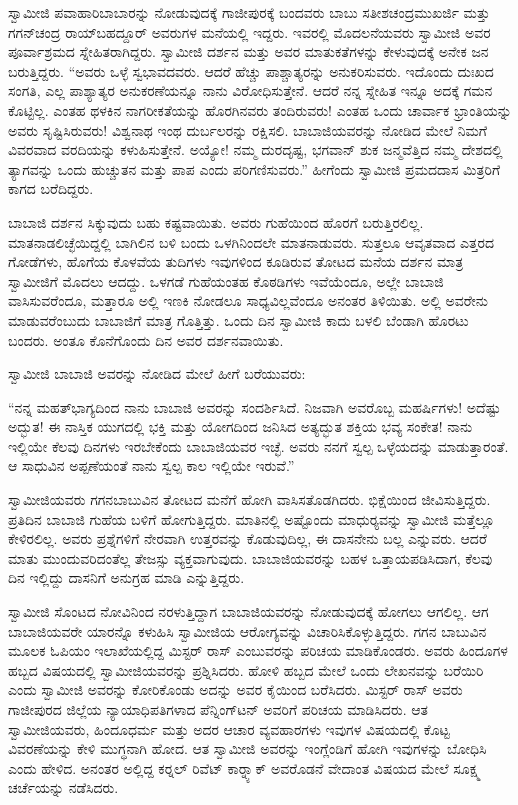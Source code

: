  ಸ್ವಾಮೀಜಿ ಪವಾಹಾರಿಬಾಬಾರನ್ನು ನೋಡುವುದಕ್ಕೆ ಗಾಜೀಪುರಕ್ಕೆ ಬಂದವರು ಬಾಬು ಸತೀಶಚಂದ್ರಮುಖರ್ಜಿ ಮತ್ತು ಗಗನ್‍ಚಂದ್ರ ರಾಯ್‍ಬಹದ್ದೂರ್ ಅವರುಗಳ ಮನೆಯಲ್ಲಿ ಇದ್ದರು. ಇವರಲ್ಲಿ ಮೊದಲನೆಯವರು ಸ್ವಾಮೀಜಿ ಅವರ ಪೂರ್ವಾಶ್ರಮದ ಸ್ನೇಹಿತರಾಗಿದ್ದರು. ಸ್ವಾಮೀಜಿ ದರ್ಶನ ಮತ್ತು ಅವರ ಮಾತುಕತೆಗಳನ್ನು ಕೇಳುವುದಕ್ಕೆ ಅನೇಕ ಜನ ಬರುತ್ತಿದ್ದರು. “ಅವರು ಒಳ್ಳೆ ಸ್ವಭಾವದವರು. ಆದರೆ ಹೆಚ್ಚು ಪಾಶ್ಚಾತ್ಯರನ್ನು ಅನುಕರಿಸುವರು. ಇದೊಂದು ದುಃಖದ ಸಂಗತಿ, ಎಲ್ಲ ಪಾಶ್ಯಾತ್ಯರ ಅನುಕರಣೆಯನ್ನೂ ನಾನು ವಿರೋಧಿಸುತ್ತೇನೆ. ಆದರೆ ನನ್ನ ಸ್ನೇಹಿತ ಇನ್ನೂ ಅದಕ್ಕೆ ಗಮನ ಕೊಟ್ಟಿಲ್ಲ. ಎಂತಹ ಥಳಕಿನ ನಾಗರೀಕತೆಯನ್ನು ಹೊರಗಿನವರು ತಂದಿರುವರು! ಎಂತಹ ಒಂದು ಚಾರ್ವಾಕ ಭ್ರಾಂತಿಯನ್ನು ಅವರು ಸೃಷ್ಟಿಸಿರುವರು! ವಿಶ್ವನಾಥ ಇಂಥ ದುರ್ಬಲರನ್ನು ರಕ್ಷಿಸಲಿ. ಬಾಬಾಜಿಯವರನ್ನು ನೋಡಿದ ಮೇಲೆ ನಿಮಗೆ ವಿವರವಾದ ವರದಿಯನ್ನು ಕಳುಹಿಸುತ್ತೇನೆ. ಅಯ್ಯೋ! ನಮ್ಮ ದುರದೃಷ್ಟ, ಭಗವಾನ್ ಶುಕ ಜನ್ಮವೆತ್ತಿದ ನಮ್ಮ ದೇಶದಲ್ಲಿ ತ್ಯಾಗವನ್ನು ಒಂದು ಹುಚ್ಚುತನ ಮತ್ತು ಪಾಪ ಎಂದು ಪರಿಗಣಿಸುವರು.” ಹೀಗೆಂದು ಸ್ವಾಮೀಜಿ ಪ್ರಮದದಾಸ ಮಿತ್ರರಿಗೆ ಕಾಗದ ಬರೆದಿದ್ದರು. 

 ಬಾಬಾಜಿ ದರ್ಶನ ಸಿಕ್ಕುವುದು ಬಹು ಕಷ್ಟವಾಯಿತು. ಅವರು ಗುಹೆಯಿಂದ ಹೊರಗೆ ಬರುತ್ತಿರಲಿಲ್ಲ. ಮಾತನಾಡಲಿಚ್ಛೆಯಿದ್ದಲ್ಲಿ ಬಾಗಿಲಿನ ಬಳಿ ಬಂದು ಒಳಗಿನಿಂದಲೇ ಮಾತನಾಡುವರು. ಸುತ್ತಲೂ ಆವೃತವಾದ ಎತ್ತರದ ಗೋಡೆಗಳು, ಹೊಗೆಯ ಕೊಳವೆಯ ತುದಿಗಳು ಇವುಗಳಿಂದ ಕೂಡಿರುವ ತೋಟದ ಮನೆಯ ದರ್ಶನ ಮಾತ್ರ ಸ್ವಾಮೀಜಿಗೆ ಮೊದಲು ಆದದ್ದು. ಒಳಗಡೆ ಗುಹೆಯಂತಹ ಕೊಠಡಿಗಳು ಇವೆಯೆಂದೂ, ಅಲ್ಲೇ ಬಾಬಾಜಿ ವಾಸಿಸುವರೆಂದೂ, ಮತ್ತಾರೂ ಅಲ್ಲಿ ಇಣಕಿ ನೋಡಲೂ ಸಾಧ್ಯವಿಲ್ಲವೆಂದೂ ಅನಂತರ ತಿಳಿಯಿತು. ಅಲ್ಲಿ ಅವರೇನು ಮಾಡುವರೆಂಬುದು ಬಾಬಾಜಿಗೆ ಮಾತ್ರ ಗೊತ್ತಿತ್ತು. ಒಂದು ದಿನ ಸ್ವಾಮೀಜಿ ಕಾದು ಬಳಲಿ ಬೆಂಡಾಗಿ ಹೊರಟು ಬಂದರು. ಅಂತೂ ಕೊನೆಗೊಂದು ದಿನ ಅವರ ದರ್ಶನವಾಯಿತು. 

 ಸ್ವಾಮೀಜಿ ಬಾಬಾಜಿ ಅವರನ್ನು ನೋಡಿದ ಮೇಲೆ ಹೀಗೆ ಬರೆಯುವರು: 

 “ನನ್ನ ಮಹತ್‍ಭಾಗ್ಯದಿಂದ ನಾನು ಬಾಬಾಜಿ ಅವರನ್ನು ಸಂದರ್ಶಿಸಿದೆ. ನಿಜವಾಗಿ ಅವರೊಬ್ಬ ಮಹರ್ಷಿಗಳು! ಅದೆಷ್ಟು ಅದ್ಭುತ! ಈ ನಾಸ್ತಿಕ ಯುಗದಲ್ಲಿ ಭಕ್ತಿ ಮತ್ತು ಯೋಗದಿಂದ ಜನಿಸಿದ ಅತ್ಯದ್ಭುತ ಶಕ್ತಿಯ ಭವ್ಯ ಸಂಕೇತ! ನಾನು ಇಲ್ಲಿಯೇ ಕೆಲವು ದಿನಗಳು ಇರಬೇಕೆಂದು ಬಾಬಾಜಿಯವರ ಇಚ್ಛೆ. ಅವರು ನನಗೆ ಸ್ವಲ್ಪ ಒಳ್ಳೆಯದನ್ನು ಮಾಡುತ್ತಾರಂತೆ. ಆ ಸಾಧುವಿನ ಅಪ್ಪಣೆಯಂತೆ ನಾನು ಸ್ವಲ್ಪ ಕಾಲ ಇಲ್ಲಿಯೇ ಇರುವೆ.” 

 ಸ್ವಾಮೀಜಿಯವರು ಗಗನಬಾಬುವಿನ ತೋಟದ ಮನೆಗೆ ಹೋಗಿ ವಾಸಿಸತೊಡಗಿದರು. ಭಿಕ್ಷೆಯಿಂದ ಜೀವಿಸುತ್ತಿದ್ದರು. ಪ್ರತಿದಿನ ಬಾಬಾಜಿ ಗುಹೆಯ ಬಳಿಗೆ ಹೋಗುತ್ತಿದ್ದರು. ಮಾತಿನಲ್ಲಿ ಅಷ್ಟೊಂದು ಮಾಧುರ‍್ಯವನ್ನು ಸ್ವಾಮೀಜಿ ಮತ್ತೆಲ್ಲೂ ಕೇಳಿರಲಿಲ್ಲ. ಅವರು ಪ್ರಶ್ನೆಗಳಿಗೆ ನೇರವಾಗಿ ಉತ್ತರವನ್ನು ಕೊಡುವುದಿಲ್ಲ, ಈ ದಾಸನೇನು ಬಲ್ಲ ಎನ್ನುವರು. ಆದರೆ ಮಾತು ಮುಂದುವರಿದಂತೆಲ್ಲ ತೇಜಸ್ಸು ವ್ಯಕ್ತವಾಗುವುದು. ಬಾಬಾಜಿಯವರನ್ನು ಬಹಳ ಒತ್ತಾಯಪಡಿಸಿದಾಗ, ಕೆಲವು ದಿನ ಇಲ್ಲಿದ್ದು ದಾಸನಿಗೆ ಅನುಗ್ರಹ ಮಾಡಿ ಎನ್ನುತ್ತಿದ್ದರು. 

 ಸ್ವಾಮೀಜಿ ಸೊಂಟದ ನೋವಿನಿಂದ ನರಳುತ್ತಿದ್ದಾಗ ಬಾಬಾಜಿಯವರನ್ನು ನೋಡುವುದಕ್ಕೆ ಹೋಗಲು ಆಗಲಿಲ್ಲ. ಆಗ ಬಾಬಾಜಿಯವರೇ ಯಾರನ್ನೊ ಕಳುಹಿಸಿ ಸ್ವಾಮೀಜಿಯ ಆರೋಗ್ಯವನ್ನು ವಿಚಾರಿಸಿಕೊಳ್ಳುತ್ತಿದ್ದರು. ಗಗನ ಬಾಬುವಿನ ಮೂಲಕ ಓಪಿಯಂ ಇಲಾಖೆಯಲ್ಲಿದ್ದ ಮಿಸ್ಟರ್ ರಾಸ್ ಎಂಬುವರನ್ನು ಪರಿಚಯ ಮಾಡಿಕೊಂಡರು. ಅವರು ಹಿಂದೂಗಳ ಹಬ್ಬದ ವಿಷಯದಲ್ಲಿ ಸ್ವಾಮೀಜಿಯವರನ್ನು ಪ್ರಶ್ನಿಸಿದರು. ಹೋಳಿ ಹಬ್ಬದ ಮೇಲೆ ಒಂದು ಲೇಖನವನ್ನು ಬರೆಯಿರಿ ಎಂದು ಸ್ವಾಮೀಜಿ ಅವರನ್ನು ಕೋರಿಕೊಂಡು ಅದನ್ನು ಅವರ ಕೈಯಿಂದ ಬರೆಸಿದರು. ಮಿಸ್ಟರ್ ರಾಸ್ ಅವರು ಗಾಜೀಪುರದ ಜಿಲ್ಲೆಯ ನ್ಯಾಯಾಧಿಪತಿಗಳಾದ ಪೆನ್ನಿಂಗ್‍ಟನ್ ಅವರಿಗೆ ಪರಿಚಯ ಮಾಡಿಸಿದರು. ಆತ ಸ್ವಾಮೀಜಿಯವರು, ಹಿಂದೂಧರ್ಮ ಮತ್ತು ಅದರ ಆಚಾರ ವ್ಯವಹಾರಗಳು ಇವುಗಳ ವಿಷಯದಲ್ಲಿ ಕೊಟ್ಟ ವಿವರಣೆಯನ್ನು ಕೇಳಿ ಮುಗ್ಧನಾಗಿ ಹೋದ. ಆತ ಸ್ವಾಮೀಜಿ ಅವರನ್ನು ಇಂಗ್ಲೆಂಡಿಗೆ ಹೋಗಿ ಇವುಗಳನ್ನು ಬೋಧಿಸಿ ಎಂದು ಹೇಳಿದ. ಅನಂತರ ಅಲ್ಲಿದ್ದ ಕರ‍್ನಲ್ ರಿವೆಟ್ ಕಾರ‍್ನ್ಯಾಕ್ ಅವರೊಡನೆ ವೇದಾಂತ ವಿಷಯದ ಮೇಲೆ ಸೂಕ್ಷ್ಮ ಚರ್ಚೆಯನ್ನು ನಡೆಸಿದರು. 


